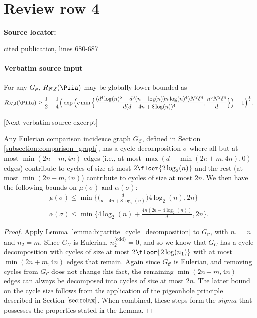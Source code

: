 \documentclass[10pt]{article}
\begin{document}
\section*{Review row 4}
\textbf{Source locator:} {\footnotesize\raggedright cited publication, lines 680-\allowbreak{}687\par}
\paragraph{Verbatim source input}
\begin{ReviewVerbatim}
\begin{cor}\label{cor:global_lower_bound}
		For any $G_\mathcal{C}$, $R_{N,\delta}(\Piia)$ may be globally lower bounded as
		\begin{align*}
		R_{N,\delta}(\Piia) \geq \frac{1}{2} - \frac{1}{4}\Big(\exp\Big(
		c \min \Big\{\frac{(d^4\log(n)^5 + d^3(n-\log(n))n\log(n)^4)N^2 \delta^4}{d(d - 4n + 8\log(n))^4}, \frac{n^5N^2 \delta^4}{d} \Big\}
		\Big) - 1\Big)^{\frac{1}{2}}.
		\end{align*}
	\end{cor}

[Next verbatim source excerpt]

		\begin{lemma}\label{lemma:Gc_cycle_decomposition}
			Any Eulerian comparison incidence graph $G_\mathcal{C}$, defined in Section \ref{subsection:comparison_graph}, has a cycle decomposition $\sigma$ where all but at most $\min(2n+m, 4n)$ edges (i.e., at most $\max(d-\min(2n+m, 4n), 0)$ edges) contribute to cycles of size at most $2\floor{2 \log_2(n)}$ and the rest (at most $\min(2n+m, 4n)$) contribute to cycles of size at most $2n$. We then have the following bounds on $\mu(\sigma)$ and $\alpha(\sigma)$:
			\begin{align*}
			\mu(\sigma) \leq \min \Big\{\Big(\frac{d}{d - 4n + 8\log_2 (n)}\Big)4\log_2 (n), 2n\Big\} \\
			\alpha(\sigma) \leq \min \Big\{4 \log_2(n) + \frac{4n(2n - 4 \log_2(n))}{d}, 2n\Big\}.
			\end{align*}
		\end{lemma}
		\begin{proof}
			Apply Lemma \ref{lemma:bipartite_cycle_decomposition} to $G_\mathcal{C}$, with $n_1 = n$ and $n_2 = m$. Since $G_\mathcal{C}$ is Eulerian, $n_2^\text{(odd)} = 0$, and so we know that $G_C$ has a cycle decomposition with cycles of size at most $2 \floor{2 \log(n_1)}$ with at most $\min(2n + m, 4n)$ edges that remain. Again since $G_\mathcal{C}$ is Eulerian, and removing cycles from $G_\mathcal{C}$ does not change this fact, the remaining $\min(2n + m, 4n)$ edges can always be decomposed into cycles of size at most $2n$. The latter bound on the cycle size follows from the application of the pigeonhole principle described in Section $\ref{sec:relax}$. When combined, these steps form the $sigma$ that possesses the properties stated in the Lemma.


\end{proof}
\end{ReviewVerbatim}
\end{document}
